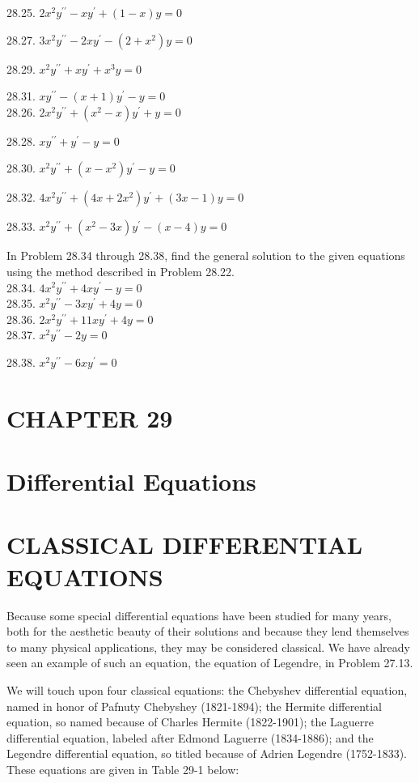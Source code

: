 \documentclass[10pt]{article}
\begin{document}
28.25. $2 x^{2} y^{\prime \prime}-x y^{\prime}+(1-x) y=0$

28.27. $3 x^{2} y^{\prime \prime}-2 x y^{\prime}-\left(2+x^{2}\right) y=0$

28.29. $x^{2} y^{\prime \prime}+x y^{\prime}+x^{3} y=0$

28.31. $x y^{\prime \prime}-(x+1) y^{\prime}-y=0$\\
28.26. $2 x^{2} y^{\prime \prime}+\left(x^{2}-x\right) y^{\prime}+y=0$

28.28. $x y^{\prime \prime}+y^{\prime}-y=0$

28.30. $x^{2} y^{\prime \prime}+\left(x-x^{2}\right) y^{\prime}-y=0$

28.32. $4 x^{2} y^{\prime \prime}+\left(4 x+2 x^{2}\right) y^{\prime}+(3 x-1) y=0$

28.33. $x^{2} y^{\prime \prime}+\left(x^{2}-3 x\right) y^{\prime}-(x-4) y=0$

In Problem 28.34 through 28.38, find the general solution to the given equations using the method described in Problem 28.22.\\
28.34. $4 x^{2} y^{\prime \prime}+4 x y^{\prime}-y=0$\\
28.35. $x^{2} y^{\prime \prime}-3 x y^{\prime}+4 y=0$\\
28.36. $2 x^{2} y^{\prime \prime}+11 x y^{\prime}+4 y=0$\\
28.37. $x^{2} y^{\prime \prime}-2 y=0$

28.38. $x^{2} y^{\prime \prime}-6 x y^{\prime}=0$

\section*{CHAPTER 29}
\section*{Differential Equations}
\section*{CLASSICAL DIFFERENTIAL EQUATIONS}
Because some special differential equations have been studied for many years, both for the aesthetic beauty of their solutions and because they lend themselves to many physical applications, they may be considered classical. We have already seen an example of such an equation, the equation of Legendre, in Problem 27.13.

We will touch upon four classical equations: the Chebyshev differential equation, named in honor of Pafnuty Chebyshey (1821-1894); the Hermite differential equation, so named because of Charles Hermite (1822-1901); the Laguerre differential equation, labeled after Edmond Laguerre (1834-1886); and the Legendre differential equation, so titled because of Adrien Legendre (1752-1833). These equations are given in Table 29-1 below:
\end{document}

